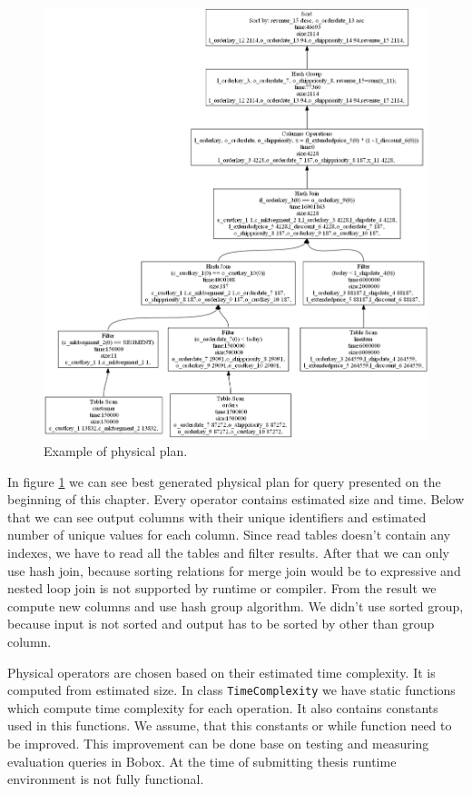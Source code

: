 \begin{figure}[h!]
  \centering
    \includegraphics[width=1.0\textwidth]{physicalplan}

      \caption{Example of physical plan.}
          \label{fig:physicalplan}
\end{figure}


In figure \ref{fig:physicalplan} we can see best generated physical plan for query presented on the beginning of this chapter. Every operator contains estimated size and time. Below that we can see output columns with their unique identifiers and estimated number of unique values for each column. Since read tables doesn't contain any indexes, we have to read all the tables and filter results. After that we can only use hash join, because sorting relations for merge join would be to expressive and nested loop join is not supported by runtime or compiler. From the result we compute new columns and use hash group algorithm. We didn't use sorted group, because input is not sorted and output has to be sorted by other than group column.

Physical operators are chosen based on their estimated time complexity. It is computed from estimated size. In class \texttt{TimeComplexity} we have static functions which compute time complexity for each operation. It also contains constants used in this functions. We assume, that this constants or while function need to be improved. This improvement can be done base on testing and measuring evaluation queries in Bobox. At the time of submitting thesis runtime environment is not fully functional.




